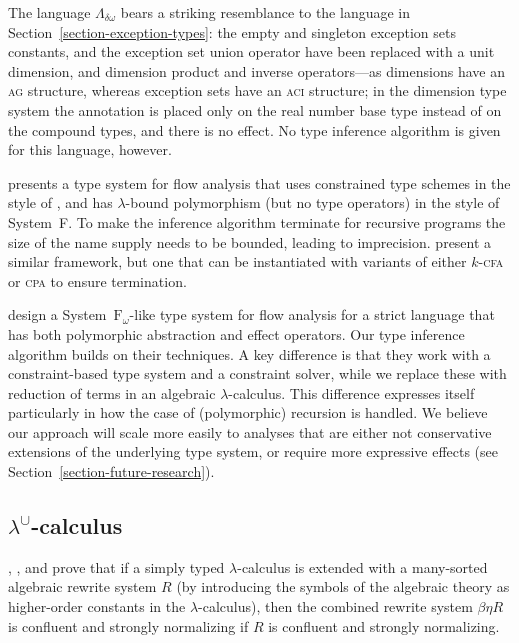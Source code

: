 \documentclass{llncs}
\newcommand{\SystemFw}{System~$\mathrm{F}_\omega$\xspace}
\newcommand{\ACIone}{\textsc{aci}\oldstylenums{1}\xspace}
\newcommand{\LambdaUnion}{\lambda^\cup}
\begin{document}
The language $\Lambda_{\delta\omega}$ bears a striking resemblance to the language in Section~\ref{section-exception-types}: the empty and singleton exception sets constants, and the exception set union operator have been replaced with a unit dimension, and dimension product and inverse operators---as dimensions have an \textsc{ag} structure, whereas exception sets have an \ACIone structure; in the dimension type system the annotation is placed only on the real number base type instead of on the compound types, and there is no effect. No type inference algorithm is given for this language, however.

\cite{Faxen:1996:PPF:646912.710963} presents a type system for flow analysis that uses constrained type schemes in the style of \cite{Aiken:1993:TIC:165180.165188}, and has $\lambda$-bound polymorphism (but no type operators) in the style of System~F. To make the inference algorithm terminate for recursive programs the size of the name supply needs to be bounded, leading to imprecision. \cite{SmithWang} present a similar framework, but one that can be instantiated with variants of either $k$-\textsc{cfa} \cite{Shivers:1991:CAH:124950} or \textsc{cpa} \cite{Agesen:1995:CPA:646153.679533} to ensure termination.

\cite{HoldermansHage} design a \SystemFw-like type system for flow analysis for a strict language that has both polymorphic abstraction and effect operators. Our type inference algorithm builds on their techniques. A key difference is that they work with a constraint-based type system and a constraint solver, while we replace these with reduction of terms in an algebraic $\lambda$-calculus. This difference expresses itself particularly in how the case of (polymorphic) recursion is handled. We believe our approach will scale more easily to analyses that are either not conservative extensions of the underlying type system, or require more expressive effects (see Section~\ref{section-future-research}).

\subsection{$\LambdaUnion$-calculus}

\cite{DBLP:conf/lics/Breazu-Tannen88a}, \cite{Okada1989}, and \cite{BREAZUTANNEN19913} prove that if a simply typed $\lambda$-calculus is extended with a many-sorted algebraic rewrite system $R$ (by introducing the symbols of the algebraic theory as higher-order constants in the $\lambda$-calculus), then the combined rewrite system $\beta\eta R$ is confluent and strongly normalizing if $R$ is confluent and strongly normalizing.
\end{document}
